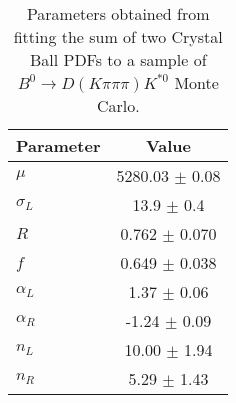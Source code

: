 \begin{table}[h]
  \centering
  \begin{tabular}{lc}
      \toprule
      Parameter & Value \\
      \midrule
      $\mu$ & 5280.03 $\pm$ 0.08 \\
      $\sigma_L$ & 13.9 $\pm$ 0.4 \\
      $R$ & 0.762 $\pm$ 0.070 \\
      $f$ & 0.649 $\pm$ 0.038 \\
      $\alpha_L$ & 1.37 $\pm$ 0.06 \\
      $\alpha_R$ & -1.24 $\pm$ 0.09 \\
      $n_L$ & 10.00 $\pm$ 1.94 \\
      $n_R$ & 5.29 $\pm$ 1.43 \\
  \bottomrule
  \end{tabular}
  \caption{Parameters obtained from fitting the sum of two Crystal Ball PDFs to a sample of $B^0 \to D(K\pi\pi\pi)K^{*0}$ Monte Carlo.}
\label{tab:signal_Kpipipi_MC_params}
\end{table}
